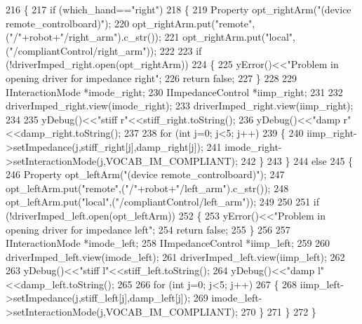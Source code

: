 \begin{DoxyCode}
216 \{
217     \textcolor{keywordflow}{if} (which\_hand==\textcolor{stringliteral}{"right"})
218     \{
219         Property opt\_rightArm(\textcolor{stringliteral}{"(device remote\_controlboard)"});
220         opt\_rightArm.put(\textcolor{stringliteral}{"remote"},(\textcolor{stringliteral}{"/"}+robot+\textcolor{stringliteral}{"/right\_arm"}).c\_str());
221         opt\_rightArm.put(\textcolor{stringliteral}{"local"},(\textcolor{stringliteral}{"/compliantControl/right\_arm"}));
222 
223         \textcolor{keywordflow}{if} (!driverImped\_right.open(opt\_rightArm))
224         \{
225             yError()<<\textcolor{stringliteral}{"Problem in opening driver for impedance right"};
226             \textcolor{keywordflow}{return} \textcolor{keyword}{false};
227         \}
228 
229         IInteractionMode  *imode\_right;
230         IImpedanceControl *iimp\_right;
231 
232         driverImped\_right.view(imode\_right);
233         driverImped\_right.view(iimp\_right);
234 
235         yDebug()<<\textcolor{stringliteral}{"stiff r"}<<stiff\_right.toString();
236         yDebug()<<\textcolor{stringliteral}{"damp r"}<<damp\_right.toString();
237 
238         \textcolor{keywordflow}{for} (\textcolor{keywordtype}{int} j=0; j<5; j++)
239         \{
240             iimp\_right->setImpedance(j,stiff\_right[j],damp\_right[j]);
241             imode\_right->setInteractionMode(j,VOCAB\_IM\_COMPLIANT);
242         \}
243     \}
244     \textcolor{keywordflow}{else}
245     \{
246         Property opt\_leftArm(\textcolor{stringliteral}{"(device remote\_controlboard)"});
247         opt\_leftArm.put(\textcolor{stringliteral}{"remote"},(\textcolor{stringliteral}{"/"}+robot+\textcolor{stringliteral}{"/left\_arm"}).c\_str());
248         opt\_leftArm.put(\textcolor{stringliteral}{"local"},(\textcolor{stringliteral}{"/compliantControl/left\_arm"}));
249     
250         
251         \textcolor{keywordflow}{if} (!driverImped\_left.open(opt\_leftArm))
252         \{
253             yError()<<\textcolor{stringliteral}{"Problem in opening driver for impedance left"};
254             \textcolor{keywordflow}{return} \textcolor{keyword}{false};
255         \}
256 
257         IInteractionMode  *imode\_left;
258         IImpedanceControl *iimp\_left;
259 
260         driverImped\_left.view(imode\_left);
261         driverImped\_left.view(iimp\_left);
262 
263         yDebug()<<\textcolor{stringliteral}{"stiff l"}<<stiff\_left.toString();
264         yDebug()<<\textcolor{stringliteral}{"damp l"}<<damp\_left.toString();
265 
266         \textcolor{keywordflow}{for} (\textcolor{keywordtype}{int} j=0; j<5; j++)
267         \{
268             iimp\_left->setImpedance(j,stiff\_left[j],damp\_left[j]);
269             imode\_left->setInteractionMode(j,VOCAB\_IM\_COMPLIANT);
270         \}
271     \}
272 \}
\end{DoxyCode}
